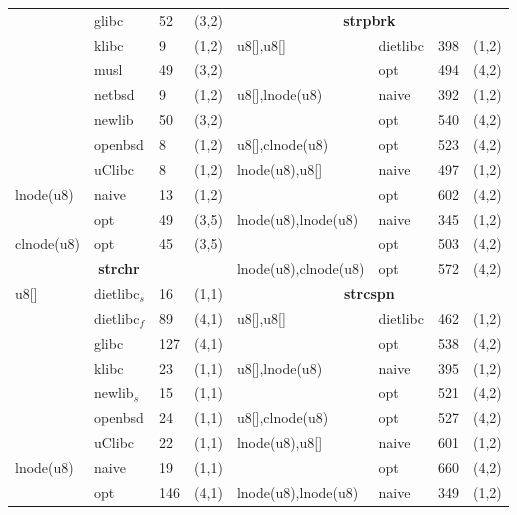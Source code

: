 \begin{figure}[H]
\begin{scriptsize}
\begin{tabular}{@{}l@{\hspace{5px}}l@{\hspace{5px}}l@{\hspace{5px}}cl@{\hspace{5px}}l@{\hspace{5px}}l@{\hspace{5px}}c@{}}
       & glibc & 52 & (3,2) &                                \multicolumn{4}{c}{\bf strpbrk} \\
       & klibc & 9 & (1,2) &                                 u8[],u8[] & dietlibc & 398 & (1,2) \\
       & musl & 49 & (3,2) &                                 & opt      & 494 & (4,2) \\
       & netbsd & 9 & (1,2) &                                u8[],lnode(u8) & naive & 392 & (1,2) \\
       & newlib & 50 & (3,2) &                               & opt & 540 & (4,2) \\
       & openbsd & 8 & (1,2) &                               u8[],clnode(u8) & opt & 523 & (4,2) \\
       & uClibc & 8 & (1,2) &                                lnode(u8),u8[] & naive & 497 & (1,2) \\
lnode(u8) & naive & 13 & (1,2) &                             & opt & 602 & (4,2) \\
            & opt & 49 & (3,5) &                             lnode(u8),lnode(u8) & naive & 345 & (1,2) \\
clnode(u8) & opt & 45 & (3,5) &                              & opt & 503 & (4,2) \\
 \multicolumn{4}{c}{\bf strchr} &                            lnode(u8),clnode(u8) & opt & 572 & (4,2) \\
u8[] & dietlibc$_s$ & 16 & (1,1) &            \multicolumn{4}{c}{\bf strcspn} \\
       & dietlibc$_f$ & 89 & (4,1) &           u8[],u8[] & dietlibc & 462 & (1,2) \\
       & glibc & 127 & (4,1) &                               & opt      & 538 & (4,2) \\
       & klibc & 23 & (1,1) &                                u8[],lnode(u8) & naive & 395 & (1,2) \\
       & newlib$_s$ & 15 & (1,1) &            & opt & 521 & (4,2) \\
       & openbsd & 24 & (1,1) &                              u8[],clnode(u8) & opt & 527 & (4,2) \\
       & uClibc & 22 & (1,1) &                               lnode(u8),u8[] & naive & 601 & (1,2) \\
lnode(u8) & naive & 19 & (1,1) &                             & opt & 660 & (4,2) \\
            & opt & 146 & (4,1) &                            lnode(u8),lnode(u8) & naive & 349 & (1,2) \\

\end{tabular}
\end{scriptsize}
\end{figure}
